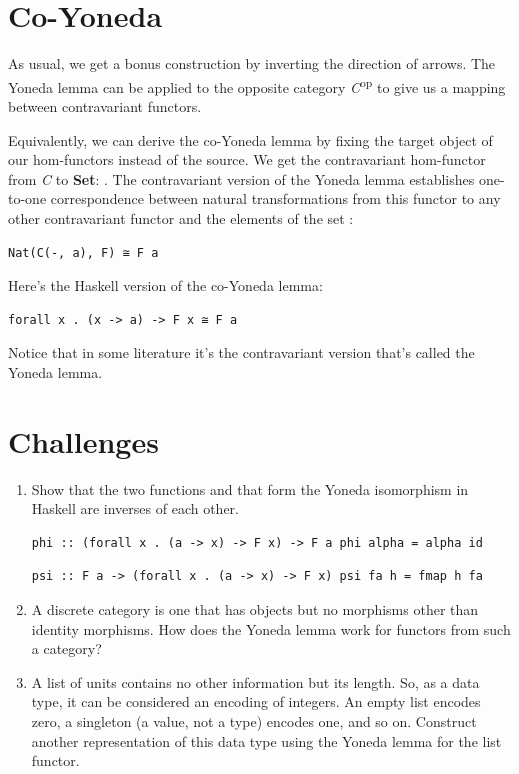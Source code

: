 \section{Co-Yoneda}\label{co-yoneda}

As usual, we get a bonus construction by inverting the direction of
arrows. The Yoneda lemma can be applied to the opposite category
\emph{C}\textsuperscript{op} to give us a mapping between contravariant
functors.

Equivalently, we can derive the co-Yoneda lemma by fixing the target
object of our hom-functors instead of the source. We get the
contravariant hom-functor from \emph{C} to \textbf{Set}:
. The contravariant version of the Yoneda lemma
establishes one-to-one correspondence between natural transformations
from this functor to any other contravariant functor  and the
elements of the set :

\begin{verbatim}
Nat(C(-, a), F) ≅ F a
\end{verbatim}

Here's the Haskell version of the co-Yoneda lemma:

\begin{verbatim}
forall x . (x -> a) -> F x ≅ F a
\end{verbatim}

Notice that in some literature it's the contravariant version that's
called the Yoneda lemma.

\section{Challenges}\label{challenges}

\begin{enumerate}
\item
  Show that the two functions  and  that form
  the Yoneda isomorphism in Haskell are inverses of each other.

\begin{verbatim}
phi :: (forall x . (a -> x) -> F x) -> F a phi alpha = alpha id
\end{verbatim}

\begin{verbatim}
psi :: F a -> (forall x . (a -> x) -> F x) psi fa h = fmap h fa
\end{verbatim}
\item
  A discrete category is one that has objects but no morphisms other
  than identity morphisms. How does the Yoneda lemma work for functors
  from such a category?
\item
  A list of units \code{{[}(){]}} contains no other information but
  its length. So, as a data type, it can be considered an encoding of
  integers. An empty list encodes zero, a singleton \code{{[}(){]}} (a
  value, not a type) encodes one, and so on. Construct another
  representation of this data type using the Yoneda lemma for the list
  functor.
\end{enumerate}

